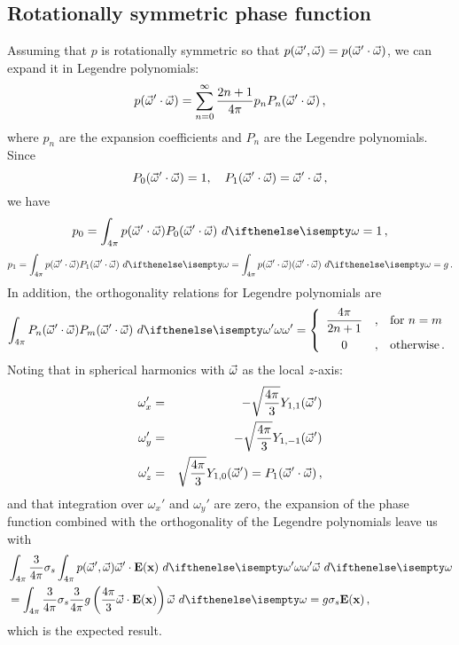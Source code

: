 \documentclass[10pt,a4paper]{article}
\begin{document}
\subsection{Rotationally symmetric phase function}
\label{sec:furtherderiv}
Assuming that $p$ is rotationally symmetric so that $p(\vec{\omega}', \vec{\omega}) = p(\vec{\omega}' \cdot \vec{\omega})$, we can expand it in Legendre polynomials:
$$
p(\vec{\omega}' \cdot \vec{\omega}) = \sum_{n = 0}^{\infty} \frac{2n+1}{4\pi} p_{n} P_n(\vec{\omega}' \cdot \vec{\omega}) \,,
$$
where $p_n$ are the expansion coefficients and $P_n$ are the Legendre polynomials. Since
$$
P_0(\vec{\omega}' \cdot \vec{\omega}) = 1, \quad P_1(\vec{\omega}' \cdot \vec{\omega}) = \vec{\omega}' \cdot \vec{\omega}  \, ,
$$
we have
$$
p_0 = \sphere{p(\omegavec' \cdot \omegavec) P_0(\omegavec' \cdot \omegavec)}{} = 1 \, ,
$$
$$
p_1 = \sphere{p(\omegavec' \cdot \omegavec) P_1(\omegavec' \cdot \omegavec)}{} = \sphere{p(\omegavec' \cdot \omegavec) (\omegavec' \cdot \omegavec)}{} = g \, .
$$
In addition, the orthogonality relations for Legendre polynomials are
$$
\sphere{P_n(\omegavec' \cdot \omegavec)P_m(\omegavec' \cdot \omegavec)}{\omega'} = \left\{\begin{array}{c@{\quad,\quad}l}\displaystyle\frac{4\pi}{2n+1} & \text{for $n=m$} \\[2ex] 0 & \text{otherwise} \, . \end{array} \right.
$$
Noting that in spherical harmonics with $\vec{\omega}$ as the local $z$-axis:
\begin{eqnarray*}
\omega_x' & = & -\sqrt{\frac{4\pi}{3}}Y_{1,1}(\vec{\omega}') \\
\omega_y' & = & -\sqrt{\frac{4\pi}{3}}Y_{1,-1}(\vec{\omega}') \\
\omega_z' & = & \sqrt{\frac{4\pi}{3}}Y_{1,0}(\vec{\omega}') = P_1(\vec{\omega}' \cdot \vec{\omega}) \, ,
\end{eqnarray*}
and that integration over $\omega_x'$ and $\omega_y'$ are zero, the expansion of the phase function combined with the orthogonality of the Legendre polynomials leave us with
\begin{equation*}
\begin{split}
&\sphere{ \frac{3}{4\pi} \scattering  \sphere {p(\omegavec', \omegavec)  \omegavec' \cdot \xvecfunc{E}}{\omega'} \omegavec}{} \\
&= \sphere{ \frac{3}{4\pi} \scattering \frac{3}{4\pi}g \left(\frac{4\pi}{3}\omegavec\cdot\xvecfunc{E}\right) \omegavec}{} = g \scattering  \xvecfunc{E} \, ,
\end{split}
\end{equation*}
which is the expected result.
\end{document}

